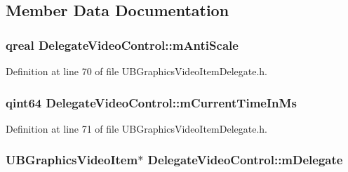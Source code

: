 \subsection{Member Data Documentation}
\hypertarget{class_delegate_video_control_abae4f33c0fbaecbb4d8ac35fb2dfd3a3}{
\subsubsection[{m\-Anti\-Scale}]{\setlength{\rightskip}{0pt plus 5cm}qreal Delegate\-Video\-Control\-::m\-Anti\-Scale\hspace{0.3cm}{\ttfamily [protected]}}}\label{d6/dfb/class_delegate_video_control_abae4f33c0fbaecbb4d8ac35fb2dfd3a3}


Definition at line 70 of file U\-B\-Graphics\-Video\-Item\-Delegate.\-h.

\hypertarget{class_delegate_video_control_a7eef884befdaa42a32b7efd4fd350b3d}{
\subsubsection[{m\-Current\-Time\-In\-Ms}]{\setlength{\rightskip}{0pt plus 5cm}qint64 Delegate\-Video\-Control\-::m\-Current\-Time\-In\-Ms\hspace{0.3cm}{\ttfamily [protected]}}}\label{d6/dfb/class_delegate_video_control_a7eef884befdaa42a32b7efd4fd350b3d}


Definition at line 71 of file U\-B\-Graphics\-Video\-Item\-Delegate.\-h.

\hypertarget{class_delegate_video_control_a93305b12d3555c063827ca7913aaf9a2}{
\subsubsection[{m\-Delegate}]{\setlength{\rightskip}{0pt plus 5cm}U\-B\-Graphics\-Video\-Item$\ast$ Delegate\-Video\-Control\-::m\-Delegate\hspace{0.3cm}{\ttfamily [protected]}}}\label{d6/dfb/class_delegate_video_control_a93305b12d3555c063827ca7913aaf9a2}


